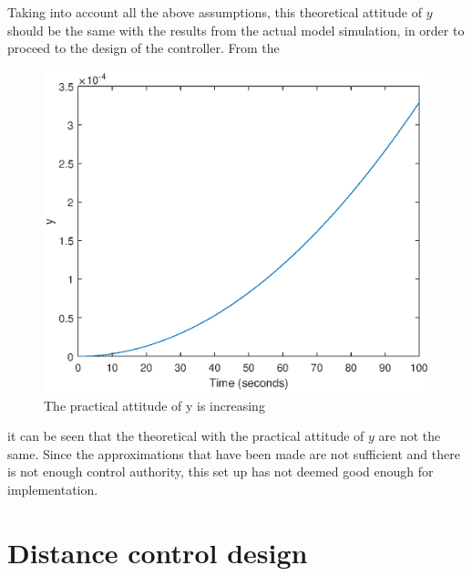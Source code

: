 % 
Taking into account all the above assumptions, this theoretical attitude of $y$ should be the same with the results from the actual model simulation, in order to proceed to the design of the controller. From the  
%  
\begin{figure}[H]
	\centering
	\includegraphics[width=0.6\linewidth]
	{figures/practiceapprox.eps}
	\caption{The practical attitude of y is increasing }
	\label{fig:practiceapprox}
\end{figure}
% 
it can be seen that the theoretical with the practical attitude of $y$  are not the same. Since the approximations that have been made are not sufficient and there is not enough control authority, this set up has not deemed good enough for implementation. 
%
\section{Distance control design}
